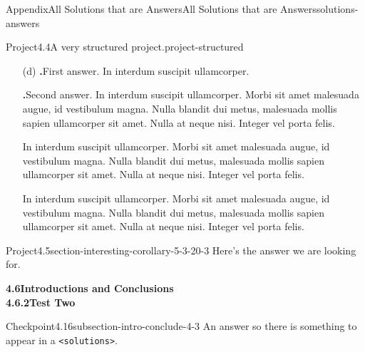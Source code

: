 \documentclass[twoside,10pt,]{article}
\newcommand{\blocktitlefont}{\relax}
\newcommand{\mono}[1]{\texttt{#1}}
\numberwithin{equation}{section}
\begin{document}
\begin{solutions-section}{Appendix}{All Solutions that are Answers}{}{All Solutions that are Answers}{}{}{solutions-answers}
\begin{projectsolution}{Project}{4.4}{A very structured project.}{project-structured}
\begin{enumerate}[font=\bfseries,label=(\alph*),ref=\alph*]
\begin{enumerate}[font=\bfseries,label=(\roman*),ref=\theenumi.\roman*]
\begin{solutionproof}{Proof}
In interdum suscipit ullamcorper. Morbi sit amet malesuada augue, id vestibulum magna. Nulla blandit dui metus, malesuada mollis sapien ullamcorper sit amet. Nulla at neque nisi. Integer vel porta felis.%
\end{solutionproof}
And a bit more to say.%
\item[(ii)]\noindent\hypertarget{project-structured-6-3-2-back}{}Right!  In interdum suscipit ullamcorper. Morbi sit amet malesuada augue, id vestibulum magna. Nulla blandit dui metus, malesuada mollis sapien ullamcorper sit amet. Nulla at neque nisi. Integer vel porta felis.%
\end{enumerate}%
\item[(d)]\noindent\textbf{\blocktitlefont 1.}\hypertarget{project-structured-7-3-back}{}\quad{}First answer.  In interdum suscipit ullamcorper.%
\par\smallskip%
\noindent\textbf{\blocktitlefont 2.}\hypertarget{project-structured-7-4-back}{}\quad{}Second answer.  In interdum suscipit ullamcorper. Morbi sit amet malesuada augue, id vestibulum magna. Nulla blandit dui metus, malesuada mollis sapien ullamcorper sit amet. Nulla at neque nisi. Integer vel porta felis.%
\par
In interdum suscipit ullamcorper. Morbi sit amet malesuada augue, id vestibulum magna. Nulla blandit dui metus, malesuada mollis sapien ullamcorper sit amet. Nulla at neque nisi. Integer vel porta felis.%
\par
In interdum suscipit ullamcorper. Morbi sit amet malesuada augue, id vestibulum magna. Nulla blandit dui metus, malesuada mollis sapien ullamcorper sit amet. Nulla at neque nisi. Integer vel porta felis.%
\end{enumerate}%
\end{projectsolution}%
\begin{projectsolution}{Project}{4.5}{}{section-interesting-corollary-5-3-20-3}%
\noindent\hypertarget{section-interesting-corollary-5-3-20-3-2-back}{}Here's the answer we are looking for.%
\end{projectsolution}%
\par\medskip
\noindent\textbf{\large{}4.6\space\textperiodcentered\space{}Introductions and Conclusions\\
4.6.2\space\textperiodcentered\space{}Test Two}
\begin{inlinesolution}{Checkpoint}{4.16}{}{subsection-intro-conclude-4-3}%
\noindent\hypertarget{subsection-intro-conclude-4-3-2-back}{}An answer so there is something to appear in a \mono{<solutions>}.%

\end{inlinesolution}
\end{solutions-section}
\end{document}
